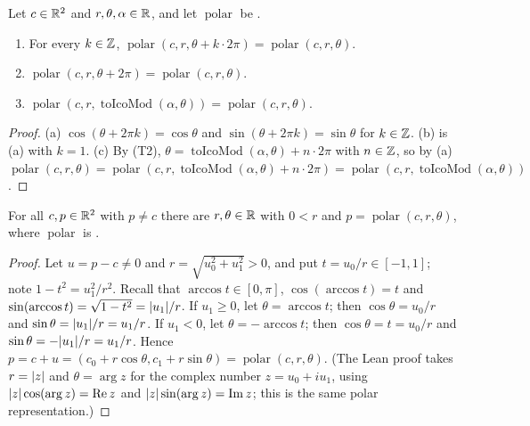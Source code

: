 \begin{lemma}\label{pc:lem:periodic}
Let $c\in\mathbb R^2$ and $r,\theta,\alpha\in\mathbb R$, and let $\operatorname{polar}$ be .
\begin{enumerate}[label=(\alph*)]
\item For every $k\in\mathbb Z$, $\operatorname{polar}(c,r,\theta+k\cdot2\pi)=\operatorname{polar}(c,r,\theta)$.
\item $\operatorname{polar}(c,r,\theta+2\pi)=\operatorname{polar}(c,r,\theta)$.
\item $\operatorname{polar}(c,r,\operatorname{toIcoMod}(\alpha,\theta))=\operatorname{polar}(c,r,\theta)$.
\end{enumerate}
\end{lemma}

\begin{proof}
(a) $\cos(\theta+2\pi k)=\cos\theta$ and $\sin(\theta+2\pi k)=\sin\theta$ for $k\in\mathbb Z$. (b) is (a) with $k=1$.
(c) By (T2), $\theta=\operatorname{toIcoMod}(\alpha,\theta)+n\cdot2\pi$ with $n\in\mathbb Z$, so by (a)
$\operatorname{polar}(c,r,\theta)=\operatorname{polar}(c,r,\operatorname{toIcoMod}(\alpha,\theta)+n\cdot2\pi)
=\operatorname{polar}(c,r,\operatorname{toIcoMod}(\alpha,\theta))$.
\end{proof}

\begin{lemma}\label{pc:lem:exists-polar}
For all $c,p\in\mathbb R^2$ with $p\neq c$ there are $r,\theta\in\mathbb R$ with $0<r$ and $p=\operatorname{polar}(c,r,\theta)$,
where $\operatorname{polar}$ is .
\end{lemma}

\begin{proof}
Let $u=p-c\neq0$ and $r=\sqrt{u_0^2+u_1^2}>0$, and put $t=u_0/r\in[-1,1]$; note $1-t^2=u_1^2/r^2$. Recall that
$\arccos t\in[0,\pi]$, $\cos(\arccos t)=t$ and $\sin(\arccos t)=\sqrt{1-t^2}=\lvert u_1\rvert/r$. If $u_1\ge0$, let
$\theta=\arccos t$; then $\cos\theta=u_0/r$ and $\sin\theta=\lvert u_1\rvert/r=u_1/r$. If $u_1<0$, let
$\theta=-\arccos t$; then $\cos\theta=t=u_0/r$ and $\sin\theta=-\lvert u_1\rvert/r=u_1/r$. Hence
$p=c+u=(c_0+r\cos\theta,c_1+r\sin\theta)=\operatorname{polar}(c,r,\theta)$. (The Lean proof takes
$r=\lvert z\rvert$ and $\theta=\arg z$ for the complex number $z=u_0+iu_1$, using $\lvert z\rvert\cos(\arg z)=\operatorname{Re}z$
and $\lvert z\rvert\sin(\arg z)=\operatorname{Im}z$; this is the same polar representation.)
\end{proof}

